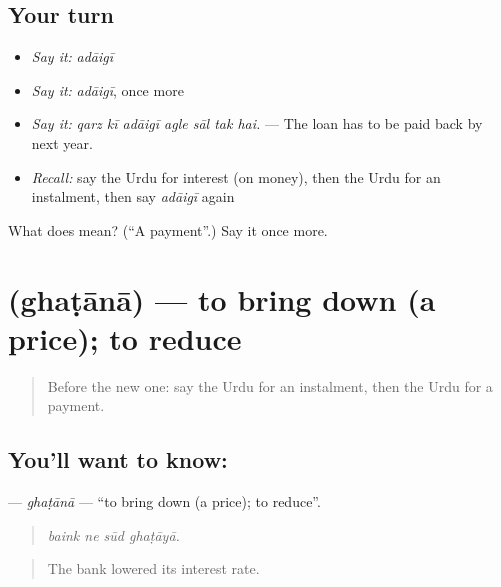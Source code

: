 \subsection*{Your turn}
\begin{itemize}
\raggedright
  \item \emph{Say it:} \emph{adāigī}
  \item \emph{Say it:} \emph{adāigī}, once more
  \item \emph{Say it:} \emph{qarz kī adāigī agle sāl tak hai.} — The loan has to be paid back by next year.
  \item \emph{Recall:} say the Urdu for interest (on money), then the Urdu for an instalment, then say \emph{adāigī} again
\end{itemize}

\begin{tcolorbox}[breakable,colback=teal!4,colframe=teal!35!black,title={Before you move on}]
What does  mean? (\textquotedblleft{}A payment\textquotedblright{}.) Say it once more.
\end{tcolorbox}
\section[\texorpdfstring{\ur{گھٹانا} (ghaṭānā)}{گھٹانا (ghaṭānā)}]{ (ghaṭānā) — to bring down (a price); to reduce}

\label{lesson:UR-C418-ghatana}



\begin{quote}
Before the new one: say the Urdu for an instalment, then the Urdu for a payment.
\end{quote}

\subsection*{You'll want to know: }
\textbf{} — \emph{ghaṭānā} — \textquotedblleft{}to bring down (a price); to reduce\textquotedblright{}.

\begin{quote}
   
\end{quote}

\begin{quote}
\emph{baink ne sūd ghaṭāyā.}
\end{quote}

\begin{quote}
The bank lowered its interest rate.
\end{quote}

